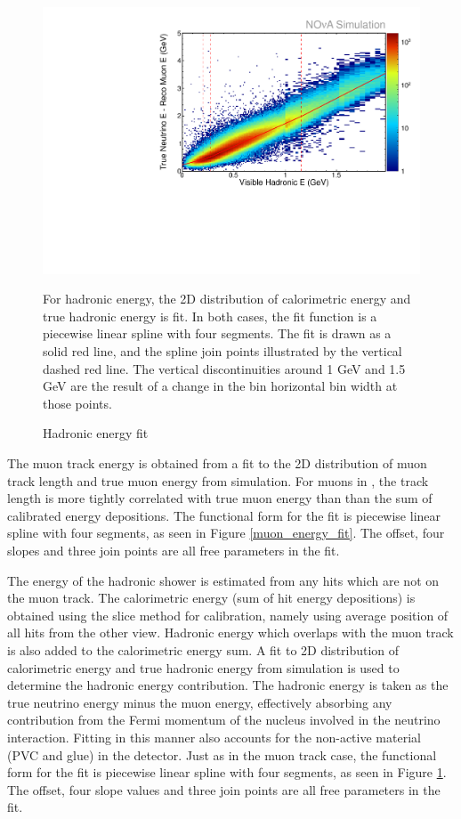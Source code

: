 \begin{figure}
  \includegraphics[width=\textwidth]{figures/plots/reco/numu_energy_had_fit.pdf}
  \caption{Hadronic energy fit}{For hadronic energy, the 2D distribution of calorimetric energy and true
  hadronic energy is fit.  In both cases, the fit function is a piecewise
  linear spline with four segments.  The fit is drawn as a solid red line,
  and the spline join points illustrated by the vertical dashed red line.
  The vertical discontinuities around 1 GeV and 1.5 GeV are the result
  of a change in the bin horizontal bin width at those points.}
  \label{had_energy_fit}
\end{figure}


The muon track energy is obtained from a fit to the 2D distribution
of muon track length and true muon energy from simulation.
For muons in \nova, the track length is more tightly correlated with
true muon energy than than the sum of calibrated energy depositions.
The functional form for the fit is piecewise linear spline with four segments,
as seen in Figure \ref{muon_energy_fit}.
The offset, four slopes and three join points are all free parameters in the
fit.


The energy of the hadronic shower is estimated from any hits which are not on
the muon track.
The calorimetric energy (sum of hit energy depositions) is obtained
using the slice method for calibration, namely using average position of all
hits from the other view.
Hadronic energy which overlaps with the muon track
\cite{sachdev2015thesis} is also added to the calorimetric energy sum.
A fit to 2D distribution of calorimetric energy and true hadronic energy
from simulation is used to determine the hadronic energy contribution.
The hadronic energy is taken as the true neutrino energy minus the muon energy,
effectively absorbing any contribution from the Fermi momentum of the
nucleus involved in the neutrino interaction.
Fitting in this manner also accounts for the non-active material (PVC and glue)
in the detector.
Just as in the muon track case, the functional form for the fit is piecewise
linear spline with four segments,
as seen in Figure \ref{had_energy_fit}.
The offset, four slope values and three join points are all free parameters in
the fit.

